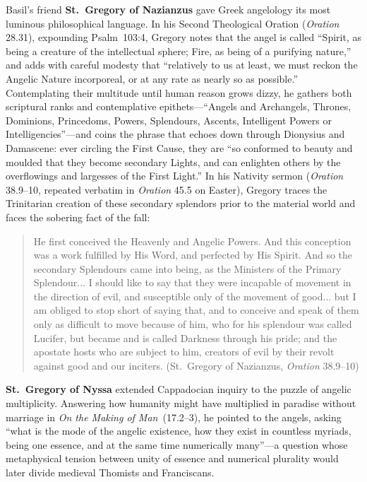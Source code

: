 Basil's friend \textbf{St.~Gregory of Nazianzus} gave Greek angelology its most luminous philosophical language. In his Second Theological Oration (\emph{Oration} 28.31), expounding Psalm~103:4, Gregory notes that the angel is called ``Spirit, as being a creature of the intellectual sphere; Fire, as being of a purifying nature,'' and adds with careful modesty that ``relatively to us at least, we must reckon the Angelic Nature incorporeal, or at any rate as nearly so as possible.'' Contemplating their multitude until human reason grows dizzy, he gathers both scriptural ranks and contemplative epithets---``Angels and Archangels, Thrones, Dominions, Princedoms, Powers, Splendours, Ascents, Intelligent Powers or Intelligencies''---and coins the phrase that echoes down through Dionysius and Damascene: ever circling the First Cause, they are ``so conformed to beauty and moulded that they become secondary Lights, and can enlighten others by the overflowings and largesses of the First Light.'' In his Nativity sermon (\emph{Oration} 38.9--10, repeated verbatim in \emph{Oration} 45.5 on Easter), Gregory traces the Trinitarian creation of these secondary splendors prior to the material world and faces the sobering fact of the fall:
\begin{quotation}
He first conceived the Heavenly and Angelic Powers. And this conception was a work fulfilled by His Word, and perfected by His Spirit. And so the secondary Splendours came into being, as the Ministers of the Primary Splendour... I should like to say that they were incapable of movement in the direction of evil, and susceptible only of the movement of good... but I am obliged to stop short of saying that, and to conceive and speak of them only as difficult to move because of him, who for his splendour was called Lucifer, but became and is called Darkness through his pride; and the apostate hosts who are subject to him, creators of evil by their revolt against good and our inciters. (St.~Gregory of Nazianzus, \emph{Oration} 38.9--10)
\end{quotation}

\textbf{St.~Gregory of Nyssa} extended Cappadocian inquiry to the puzzle of angelic multiplicity. Answering how humanity might have multiplied in paradise without marriage in \emph{On the Making of Man}~(17.2--3), he pointed to the angels, asking ``what is the mode of the angelic existence, how they exist in countless myriads, being one essence, and at the same time numerically many''---a question whose metaphysical tension between unity of essence and numerical plurality would later divide medieval Thomists and Franciscans.

